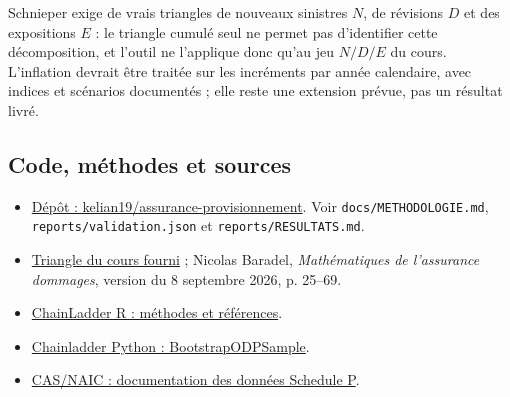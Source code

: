 \documentclass[11pt,a4paper]{article}
\newcommand{\smallnote}[1]{{\small\color{Muted}#1}}
\begin{document}
\smallnote{Schnieper exige de vrais triangles de nouveaux sinistres $N$, de révisions $D$ et des expositions $E$ : le triangle cumulé seul ne permet pas d'identifier cette décomposition, et l'outil ne l'applique donc qu'au jeu $N/D/E$ du cours. L'inflation devrait être traitée sur les incréments par année calendaire, avec indices et scénarios documentés ; elle reste une extension prévue, pas un résultat livré.}

\subsection*{Code, méthodes et sources}
\small
\begin{itemize}[itemsep=2pt]
\item \href{https://github.com/kelian19/assurance-provisionnement}{Dépôt : kelian19/assurance-provisionnement}. Voir \texttt{docs/METHODOLOGIE.md}, \texttt{reports/validation.json} et \texttt{reports/RESULTATS.md}.
\item \href{https://nicolasbaradel.fr/enseignement/ressources/R/donneesMACK.txt}{Triangle du cours fourni} ; Nicolas Baradel, \emph{Mathématiques de l'assurance dommages}, version du 8 septembre 2026, p. 25--69.
\item \href{https://mages.github.io/ChainLadder/articles/ChainLadder.html}{ChainLadder R : méthodes et références}.
\item \href{https://chainladder-python.readthedocs.io/main/library/generated/chainladder.BootstrapODPSample.html}{Chainladder Python : BootstrapODPSample}.
\item \href{https://casact.github.io/raw_package/reference/NAIC.html}{CAS/NAIC : documentation des données Schedule P}.
\end{itemize}
\end{document}
